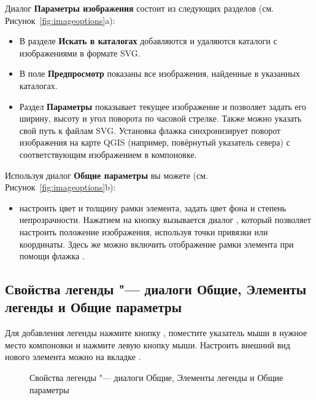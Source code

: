 
Диалог \textbf{Параметры изображения} состоит из следующих
разделов (см. Рисунок~\ref{fig:imageoptions}a):

\begin{itemize}[label=--]
\item В разделе \textbf{Искать в каталогах} добавляются и удаляются
каталоги с изображениями в формате SVG.
\item В поле \textbf{Предпросмотр} показаны все изображения, найденные
в указанных каталогах.
\item Раздел \textbf{Параметры} показывает текущее изображение и
позволяет задать его ширину, высоту и угол поворота по часовой стрелке.
Также можно указать свой путь к файлам SVG. Установка флажка
 синхронизирует поворот изображения
на карте QGIS (например, повёрнутый указатель севера) с соответствующим
изображением в компоновке.
\end{itemize}


Используя диалог \textbf{Общие параметры} вы можете
(см. Рисунок~\ref{fig:imageoptions}b):

\begin{itemize}[label=--]
\item настроить цвет и толщину рамки элемента, задать
цвет фона и степень непрозрачности. Нажатием на кнопку 
вызывается диалог , который позволяет
настроить положение изображения, используя точки привязки или координаты.
Здесь же можно включить отображение рамки элемента при помощи флажка
.
\end{itemize}

\subsection{Свойства легенды "--- диалоги Общие, Элементы легенды и Общие параметры}

Для добавления легенды нажмите кнопку
, поместите указатель
мыши в нужное место компоновки и нажмите левую кнопку мыши. Настроить
внешний вид нового элемента можно на вкладке .

\begin{figure}[h]
\centering
   \hspace{1cm}
   \hspace{1cm}
   \caption{Свойства легенды "--- диалоги Общие, Элементы легенды и Общие параметры \wincaption}\label{fig:legendoptions}
\end{figure}

